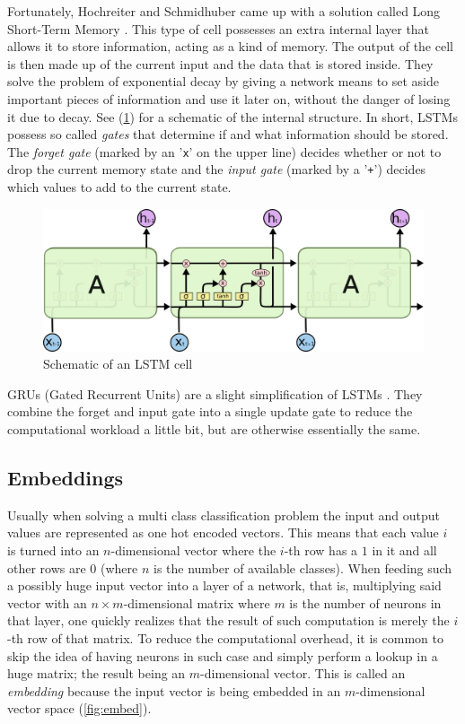     Fortunately, Hochreiter and Schmidhuber came up with a solution called
    Long Short-Term Memory \cite{lstm}.  This type of cell possesses an
    extra internal layer that allows it to store information, acting as a
    kind of memory. The output of the cell is then made up of the current
    input and the data that is stored inside. They solve the problem of
    exponential decay by giving a network means to set aside important
    pieces of information and use it later on, without the danger of
    losing it due to decay.  See (\ref{fig:lstm}) for a schematic of the
    internal structure. In short, LSTMs possess so called \textit{gates}
    that determine if and what information should be stored. The \textit{forget
    gate} (marked by an '\verb+x+' on the upper line) decides whether or not
    to drop the current memory state and the \textit{input gate} (marked
    by a '\verb|+|') decides which values to add to the current state.

    \begin{figure}
    \begin{center}
        \includegraphics[width=0.9 \linewidth]{lstm.png}
    \end{center}
        \caption{Schematic of an LSTM cell \cite{colah}}
    \label{fig:lstm}
    \end{figure}

	GRUs (Gated Recurrent Units) are a slight simplification of LSTMs \cite{gru}. They
	combine the forget and input gate into a single update gate to reduce the computational workload
	a little bit, but are otherwise essentially the same.

  \subsection{Embeddings}
  \label{sub:embeddings}
  
    Usually when solving a multi class classification problem the input and output values are
	represented as one hot encoded vectors. This means that each value $i$ is turned into an
	$n$-dimensional vector where the $i$-th row has a $1$ in it and all other rows are $0$ (where
	$n$ is the number of available classes). When feeding such a possibly huge input vector
	into a layer of a network, that is, multiplying said vector with an $n \times m$-dimensional
	matrix where $m$ is the number of neurons in that layer, one quickly realizes that the result
	of such computation is merely the $i$-th row of that matrix. To reduce the computational
	overhead, it is common to skip the idea of having neurons in such case and simply perform
	a lookup in a huge matrix; the result being an $m$-dimensional vector. This is called an
    \textit{embedding} because the input vector is being embedded in an $m$-dimensional vector space (\ref{fig:embed}).

